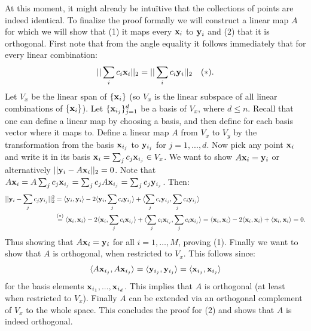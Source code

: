 At this moment, it might already be intu\"{i}tive that the collections of points are indeed identical. To finalize the proof formally we will construct a linear map $A$ for which we will show that (1) it maps every $\mathbf{x}_i$ to $\mathbf{y}_i$ and (2) that it is orthogonal. First note that from the angle equality it follows immediately that for every linear combination:
\small 
\begin{equation*}
    || \sum_i c_i \rmx_i ||_2 = || \sum_i c_i \rmy_i ||_2 \quad (*).\vspace{-.3cm}
\end{equation*}\normalsize
Let $V_x$ be the linear span of $\{\mathbf{x}_i\}$ (so $V_x$ is the linear subspace of all linear combinations of $\{\mathbf{x}_i\}$). Let $\{\mathbf{x}_{i_j}\}_{j=1}^d$ be a basis of $V_x$, where $d \leq n$. Recall that one can define a linear map by choosing a basis, and then define for each basis vector where it maps to. Define a linear map $A$ from $V_x$ to $V_y$ by the transformation from the basis $\mathbf{x}_{i_j}$ to $\mathbf{y}_{i_j}$ for $j=1,...,d$.
Now pick any point $\mathbf{x}_i$ and write it in its basis $\mathbf{x}_i = \sum_j c_j \mathbf{x}_{i_j} \in V_x$. We want to show $A\mathbf{x}_i = \mathbf{y}_i$ or alternatively $||\mathbf{y}_i - A\mathbf{x}_i||_2 = 0$. Note that $A\mathbf{x}_i = A \sum_j c_j \mathbf{x}_{i_j} =  \sum_j c_j A \mathbf{x}_{i_j} = \sum_j c_j \mathbf{y}_{i_j}$. Then:
\small
\begin{align*}
    ||\mathbf{y}_i - \sum_j c_j \mathbf{y}_{i_j}||_2^2 &= \langle \mathbf{y}_i, \mathbf{y}_i \rangle - 2 \langle \mathbf{y}_i, \sum_j c_i \mathbf{y}_{i_j} \rangle + \langle \sum_j c_i \mathbf{y}_{i_j}, \sum_j c_i \mathbf{y}_{i_j} \rangle \\
    &\stackrel{(*)}{=} \langle \mathbf{x}_i, \mathbf{x}_i \rangle - 2 \langle \mathbf{x}_i, \sum_j c_i \mathbf{x}_{i_j} \rangle + \langle \sum_j c_i \mathbf{x}_{i_j}, \sum_j c_i \mathbf{x}_{i_j} \rangle = \langle \mathbf{x}_i, \mathbf{x}_i \rangle - 2 \langle \mathbf{x}_i, \mathbf{x}_i \rangle + \langle \mathbf{x}_i, \mathbf{x}_i \rangle = 0.
\end{align*}\normalsize
Thus showing that $A\mathbf{x}_i = \mathbf{y}_i$ for all $i = 1, \ldots, M$, proving (1). Finally we want to show that $A$ is orthogonal, when restricted to $V_x$. This follows since:
\begin{equation*}
    \langle A \mathbf{x}_{i_j}, A \mathbf{x}_{i_j} \rangle = \langle \mathbf{y}_{i_j}, \mathbf{y}_{i_j} \rangle = \langle \mathbf{x}_{i_j}, \mathbf{x}_{i_j} \rangle 
\end{equation*}
for the basis elements $\mathbf{x}_{i_1},...,\mathbf{x}_{i_d}$. This implies that $A$ is orthogonal (at least when restricted to $V_x$). Finally $A$ can be extended via an orthogonal complement of $V_x$ to the whole space. This concludes the proof for (2) and shows that $A$ is indeed orthogonal.



